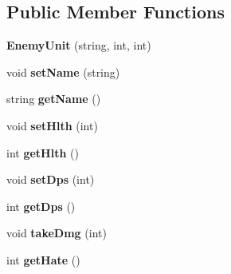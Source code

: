 \subsection*{Public Member Functions}
\begin{DoxyCompactItemize}
\item 
\hypertarget{class_enemy_unit_a3ae128f102ada75eb2a6e852473142a9}{}{\bfseries Enemy\+Unit} (string, int, int)\label{class_enemy_unit_a3ae128f102ada75eb2a6e852473142a9}

\item 
\hypertarget{class_enemy_unit_afb5ef9ae0126b962b832f11a0dc580fe}{}void {\bfseries set\+Name} (string)\label{class_enemy_unit_afb5ef9ae0126b962b832f11a0dc580fe}

\item 
\hypertarget{class_enemy_unit_ac00dac68029c40282e0a1d68e84da6c5}{}string {\bfseries get\+Name} ()\label{class_enemy_unit_ac00dac68029c40282e0a1d68e84da6c5}

\item 
\hypertarget{class_enemy_unit_af541efec09d48c3188abb76a9dc3c6db}{}void {\bfseries set\+Hlth} (int)\label{class_enemy_unit_af541efec09d48c3188abb76a9dc3c6db}

\item 
\hypertarget{class_enemy_unit_a6b36534e52356d7ef96c17f1b0fc7dc9}{}int {\bfseries get\+Hlth} ()\label{class_enemy_unit_a6b36534e52356d7ef96c17f1b0fc7dc9}

\item 
\hypertarget{class_enemy_unit_a69f40fbd4d6cfff6d85d67efd4bedaea}{}void {\bfseries set\+Dps} (int)\label{class_enemy_unit_a69f40fbd4d6cfff6d85d67efd4bedaea}

\item 
\hypertarget{class_enemy_unit_a0410203a93c5daaf536a4a71e853eb5a}{}int {\bfseries get\+Dps} ()\label{class_enemy_unit_a0410203a93c5daaf536a4a71e853eb5a}

\item 
\hypertarget{class_enemy_unit_adf121b3d60198679616611b8a354003b}{}void {\bfseries take\+Dmg} (int)\label{class_enemy_unit_adf121b3d60198679616611b8a354003b}

\item 
\hypertarget{class_enemy_unit_a46f445bef004fbee07ec13529c4dea62}{}int {\bfseries get\+Hate} ()\label{class_enemy_unit_a46f445bef004fbee07ec13529c4dea62}

\end{DoxyCompactItemize}
